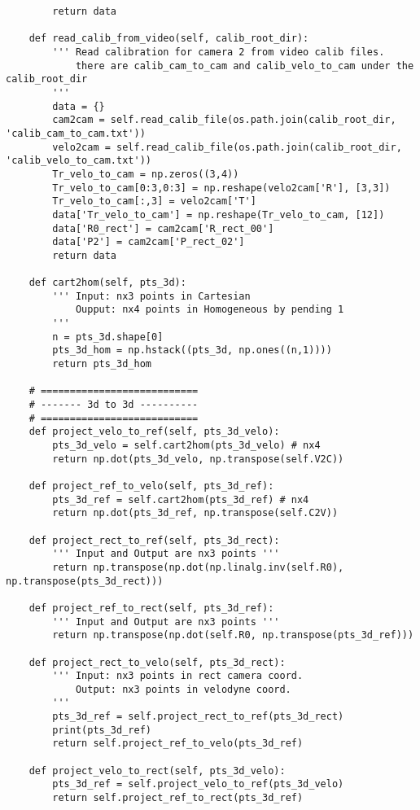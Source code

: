 \begin{verbatim}
        return data
    
    def read_calib_from_video(self, calib_root_dir):
        ''' Read calibration for camera 2 from video calib files.
            there are calib_cam_to_cam and calib_velo_to_cam under the calib_root_dir
        '''
        data = {}
        cam2cam = self.read_calib_file(os.path.join(calib_root_dir, 'calib_cam_to_cam.txt'))
        velo2cam = self.read_calib_file(os.path.join(calib_root_dir, 'calib_velo_to_cam.txt'))
        Tr_velo_to_cam = np.zeros((3,4))
        Tr_velo_to_cam[0:3,0:3] = np.reshape(velo2cam['R'], [3,3])
        Tr_velo_to_cam[:,3] = velo2cam['T']
        data['Tr_velo_to_cam'] = np.reshape(Tr_velo_to_cam, [12])
        data['R0_rect'] = cam2cam['R_rect_00']
        data['P2'] = cam2cam['P_rect_02']
        return data

    def cart2hom(self, pts_3d):
        ''' Input: nx3 points in Cartesian
            Oupput: nx4 points in Homogeneous by pending 1
        '''
        n = pts_3d.shape[0]
        pts_3d_hom = np.hstack((pts_3d, np.ones((n,1))))
        return pts_3d_hom
 
    # =========================== 
    # ------- 3d to 3d ---------- 
    # =========================== 
    def project_velo_to_ref(self, pts_3d_velo):
        pts_3d_velo = self.cart2hom(pts_3d_velo) # nx4
        return np.dot(pts_3d_velo, np.transpose(self.V2C))

    def project_ref_to_velo(self, pts_3d_ref):
        pts_3d_ref = self.cart2hom(pts_3d_ref) # nx4
        return np.dot(pts_3d_ref, np.transpose(self.C2V))

    def project_rect_to_ref(self, pts_3d_rect):
        ''' Input and Output are nx3 points '''
        return np.transpose(np.dot(np.linalg.inv(self.R0), np.transpose(pts_3d_rect)))
    
    def project_ref_to_rect(self, pts_3d_ref):
        ''' Input and Output are nx3 points '''
        return np.transpose(np.dot(self.R0, np.transpose(pts_3d_ref)))
 
    def project_rect_to_velo(self, pts_3d_rect):
        ''' Input: nx3 points in rect camera coord.
            Output: nx3 points in velodyne coord.
        ''' 
        pts_3d_ref = self.project_rect_to_ref(pts_3d_rect)
        print(pts_3d_ref)
        return self.project_ref_to_velo(pts_3d_ref)

    def project_velo_to_rect(self, pts_3d_velo):
        pts_3d_ref = self.project_velo_to_ref(pts_3d_velo)
        return self.project_ref_to_rect(pts_3d_ref)


\end{verbatim}
